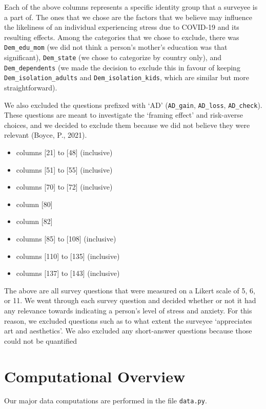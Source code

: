 \documentclass[fontsize=11pt]{article}
\begin{document}
    Each of the above columns represents a specific identity group that a surveyee is a part of. The ones that we chose are the factors that we believe may influence the likeliness of an individual experiencing stress due to COVID-19 and its resulting effects. Among the categories that we chose to exclude, there was \texttt{Dem\_edu\_mom} (we did not think a person’s mother’s education was that significant), \texttt{Dem\_state} (we chose to categorize by country only), and \texttt{Dem\_dependents} (we made the decision to exclude this in favour of keeping \texttt{Dem\_isolation\_adults} and \texttt{Dem\_isolation\_kids}, which are similar but more straightforward).

    We also excluded the questions prefixed with ‘AD’ (\texttt{AD\_gain}, \texttt{AD\_loss}, \texttt{AD\_check}). These questions are meant to investigate the ‘framing effect’ and risk-averse choices, and we decided to exclude them because we did not believe they were relevant (Boyce, P., 2021).
    \begin{itemize}
        \item columns [21] to [48] (inclusive)
        \item columns [51] to [55] (inclusive)
        \item columns [70] to [72] (inclusive)
        \item column [80]
        \item column [82]
        \item columns [85] to [108] (inclusive)
        \item columns [110] to [135] (inclusive)
        \item columns [137] to [143] (inclusive)
    \end{itemize}

    The above are all survey questions that were measured on a Likert scale of 5, 6, or 11. We went through each survey question and decided whether or not it had any relevance towards indicating a person’s level of stress and anxiety. For this reason, we excluded questions such as to what extent the surveyee ‘appreciates art and aesthetics’. We also excluded any short-answer questions because those could not be quantified

    \section*{Computational Overview}

    Our major data computations are performed in the file \texttt{data.py}.
\end{document}
